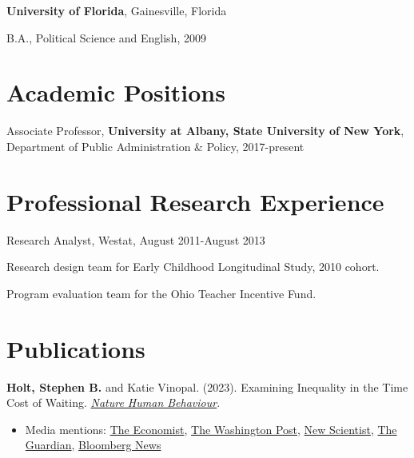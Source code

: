 \documentclass[margin,line]{res}
\newenvironment{list1}{
  \begin{list}{\ding{113}}{%
      \setlength{\itemsep}{0in}
      \setlength{\parsep}{0in} \setlength{\parskip}{0in}
      \setlength{\topsep}{0in} \setlength{\partopsep}{0in} 
      \setlength{\leftmargin}{0.17in}}}{\end{list}}
\begin{document}
\begin{resume}
{\bf University of Florida}, Gainesville, Florida\\
\vspace*{-.1in}
\begin{list1}
\item[] B.A., Political Science and English, 2009
\end{list1}

\section{\sc Academic Positions}
Associate Professor, \textbf{University at Albany, State University of New York}, Department of Public Administration \& Policy, 2017-present

\section{\sc Professional Research Experience}
\begin{hangparas}{.25in}{1}
Research Analyst, Westat, August 2011-August 2013
\begin{list1}
\item[] Research design team for Early Childhood Longitudinal Study, 2010 cohort.
\item[] Program evaluation team for the Ohio Teacher Incentive Fund.
\end{list1}

\end{hangparas}

\section{\sc Publications}
\textbf{Holt, Stephen B.} and Katie Vinopal. (2023). Examining Inequality in the Time Cost of Waiting. \href{https://doi.org/10.1038/s41562-023-01524-w}{\textit{Nature Human Behaviour}}.
\begin{itemize}
\item[] Media mentions: \href{https://www.economist.com/united-states/2021/05/08/black-americans-spend-more-of-the-day-being-kept-waiting}{The Economist}, \href{https://www.washingtonpost.com/business/another-sign-of-inequality-minutes-spent-waiting/2023/02/14/4579a0de-ac76-11ed-b0ba-9f4244c6e5da_story.html}{The Washington Post}, \href{https://www.newscientist.com/article/2358744-people-with-low-incomes-spend-longer-waiting-for-basic-services-in-us/}{New Scientist}, \href{https://www.theguardian.com/commentisfree/2023/feb/12/if-the-government-could-only-give-poorer-people-some-more-time}{The Guardian}, \href{https://www.bloomberg.com/opinion/articles/2023-02-14/waiting-at-the-counter-delays-add-up-by-income-race-and-zip-code}{Bloomberg News}
\end{itemize}


\end{resume}
\end{document}
